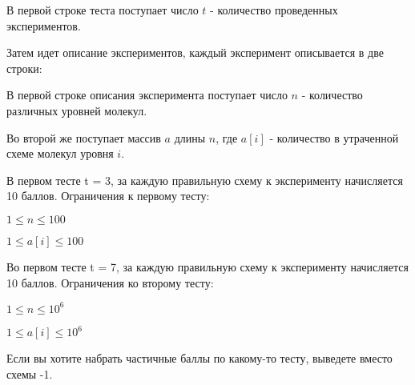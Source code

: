 В первой строке теста поступает число $t$ - количество проведенных экспериментов.

Затем идет описание экспериментов, каждый эксперимент описывается в две строки:

 
В первой строке описания эксперимента поступает число $n$ - количество различных уровней молекул. 

Во второй же поступает массив $a$ длины $n$, где $a[i]$ - количество в утраченной схеме молекул уровня $i$.

В первом тесте t = 3, за каждую правильную схему к эксперименту начисляется 10 баллов. Ограничения к первому тесту:

$1 \le n \le 100$

$1 \le a[i] \le 100$


Во первом тесте t = 7, за каждую правильную схему к эксперименту начисляется 10 баллов.
Ограничения ко второму тесту:

$1 \le n \le 10^6$

$1 \le a[i] \le 10^6$

Если вы хотите набрать частичные баллы по какому-то тесту, выведете вместо схемы -1.

